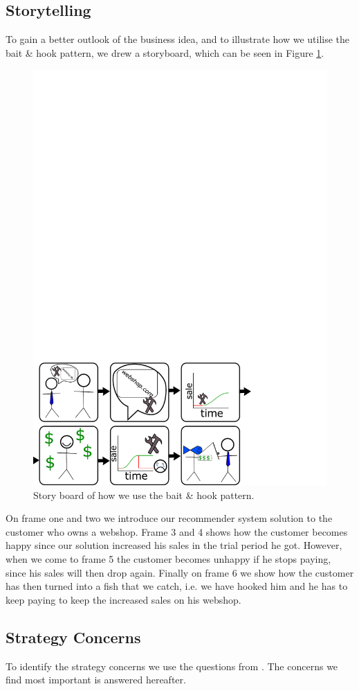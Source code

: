 \subsection{Storytelling}
To gain a better outlook of the business idea, and to illustrate how we utilise the bait \& hook pattern, we drew a storyboard, which can be seen in Figure \cref{fig:drawing}.

\begin{figure}
	\centering
	\includegraphics[width=0.7\linewidth]{figures/drawing}
	\caption{Story board of how we use the bait \& hook pattern.}
	\label{fig:drawing}
\end{figure}
 
 On frame one and two we introduce our recommender system solution to the customer who owns a webshop.
 Frame 3 and 4 shows how the customer becomes happy since our solution increased his sales in the trial period he got.
 However, when we come to frame 5 the customer becomes unhappy if he stops paying, since his sales will then drop again.
 Finally on frame 6 we show how the customer has then turned into a fish that we catch, i.e. we have hooked him and he has to keep paying to keep the increased sales on his webshop.
 
\subsection{Strategy Concerns}
To identify the strategy concerns we use the questions from \citet[pg. 202-208]{osterwalder2010business}.
The concerns we find most important is answered hereafter.


